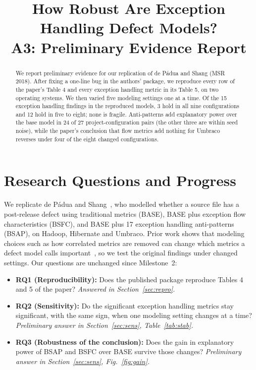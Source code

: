\documentclass[conference]{IEEEtran}
\begin{document}
\sloppy

\title{How Robust Are Exception Handling Defect Models?\\
A3: Preliminary Evidence Report}

\author{
}

\maketitle

\begin{abstract}
We report preliminary evidence for our replication of de P\'adua and Shang (MSR 2018). After fixing a one-line bug in the authors' package, we reproduce every row of the paper's Table 4 and every exception handling metric in its Table 5, on two operating systems. We then varied five modeling settings one at a time. Of the 15 exception handling findings in the reproduced models, 3 hold in all nine configurations and 12 hold in five to eight; none is fragile. Anti-patterns add explanatory power over the base model in 24 of 27 project-configuration pairs (the other three are within seed noise), while the paper's conclusion that flow metrics add nothing for Umbraco reverses under four of the eight changed configurations.

\end{abstract}

\section{Research Questions and Progress}
We replicate de P\'adua and Shang~\cite{padua2018msr}, who modelled whether a source file has a post-release defect using traditional metrics (BASE), BASE plus exception flow characteristics (BSFC), and BASE plus 17 exception handling anti-patterns (BSAP), on Hadoop, Hibernate and Umbraco. Prior work shows that modeling choices such as how correlated metrics are removed can change which metrics a defect model calls important~\cite{jiarpakdee2021tse,shepperd2014bias}, so we test the original findings under changed settings. Our questions are unchanged since Milestone~2:
\begin{itemize}
\item \textbf{RQ1 (Reproducibility):} Does the published package reproduce Tables 4 and 5 of the paper? \emph{Answered in Section~\ref{sec:repro}.}
\item \textbf{RQ2 (Sensitivity):} Do the significant exception handling metrics stay significant, with the same sign, when one modeling setting changes at a time? \emph{Preliminary answer in Section~\ref{sec:sens}, Table~\ref{tab:stab}.}
\item \textbf{RQ3 (Robustness of the conclusion):} Does the gain in explanatory power of BSAP and BSFC over BASE survive those changes? \emph{Preliminary answer in Section~\ref{sec:sens}, Fig.~\ref{fig:gain}.}
\end{itemize}
\end{document}
